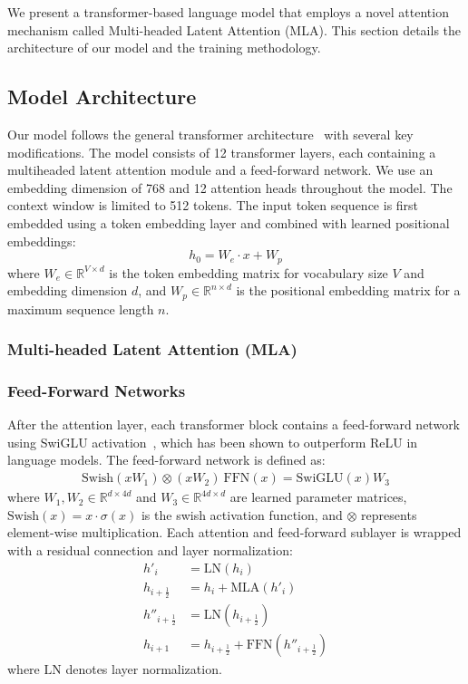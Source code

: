 We present a transformer-based language model that employs a novel attention mechanism called Multi-headed Latent Attention (MLA). This section details the architecture of our model and the training methodology.
\subsection{Model Architecture}
Our model follows the general transformer architecture~\cite{vaswani2023attentionneed} with several key modifications. The model consists of 12 transformer layers, each containing a multiheaded latent attention module and a feed-forward network. We use an embedding dimension of 768 and 12 attention heads throughout the model. The context window is limited to 512 tokens.
The input token sequence is first embedded using a token embedding layer and combined with learned positional embeddings:
\begin{equation}
h_0 = W_e \cdot x + W_p
\end{equation}
\noindent where $W_e \in \mathbb{R}^{V \times d}$ is the token embedding matrix for vocabulary size $V$ and embedding dimension $d$, and $W_p \in \mathbb{R}^{n \times d}$ is the positional embedding matrix for a maximum sequence length $n$.
\subsubsection{Multi-headed Latent Attention (MLA)}

\subsubsection{Feed-Forward Networks}
After the attention layer, each transformer block contains a feed-forward network using SwiGLU activation~\cite{shazeer2020glu}, which has been shown to outperform ReLU in language models. The feed-forward network is defined as:
\begin{align}
\text{Swish}(xW_1) \otimes (xW_2) \
\text{FFN}(x) = \text{SwiGLU}(x)W_3
\end{align}
\noindent where $W_1, W_2 \in \mathbb{R}^{d \times 4d}$ and $W_3 \in \mathbb{R}^{4d \times d}$ are learned parameter matrices, $\text{Swish}(x) = x \cdot \sigma(x)$ is the swish activation function, and $\otimes$ represents element-wise multiplication.
Each attention and feed-forward sublayer is wrapped with a residual connection and layer normalization:
\begin{align}
  h'_i &= \mathrm{LN}(h_i) \\
  h_{i+\frac12} &= h_i + \mathrm{MLA}(h'_i) \\
  h''_{i+\frac12} &= \mathrm{LN}(h_{i+\frac12}) \\
  h_{i+1} &= h_{i+\frac12} + \mathrm{FFN}(h''_{i+\frac12})
\end{align}
\noindent where $\text{LN}$ denotes layer normalization.
